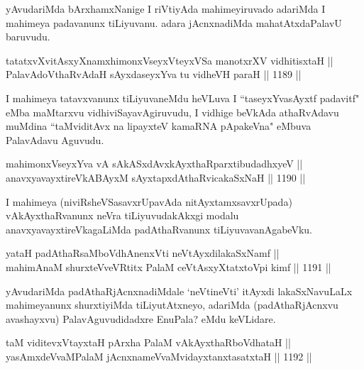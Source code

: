 \begin{artha}
yAvudariMda bArxhamxNanige I riVtiyAda mahimeyiruvado adariMda I mahimeya padavanunx tiLiyuvanu. adara jAcnxnadiMda mahatAtxdaPalavU baruvudu.
\end{artha}


\begin{shl}
tatatxvXvitAsxyXnamxhimonxV\s seyxVteyxVSa manotxrXV vidhitisxtaH || \\
PalavAdoV\s thaRvAdaH sAyxdaseyxYva tu vidheVH paraH \hfill || 1189 ||  
\end{shl}

\begin{artha}
I mahimeya tatavxvanunx tiLiyuvaneMdu heVLuva I ``taseyxYvasAyxtf padavitf" eMba maMtarxvu vidhiviSayavAgiruvudu, I vidhige beVkAda athaRvAdavu muMdina ``taMviditAvx na lipayxteV kamaRNA pApakeVna" eMbuva PalavAdavu Aguvudu.
\end{artha}

\begin{shl}
mahimonxV\s seyxYva vA sAkASxdAvxkAyxthaRparxtibudadhxyeV || \\
anavxyavayxtireVkABAyxM sAyxtapxdAthaRvicakaSxNaH \hfill || 1190 ||  
\end{shl}

\begin{artha}
I mahimeya (niviRsheVSasavxrUpavAda nitAyxtamxsavxrUpada) vAkAyxthaRvanunx neVra tiLiyuvudakAkxgi modalu anavxyavayxtireVkagaLiMda padAthaRvanunx tiLiyuvavanAgabeVku.
\end{artha}


\begin{shl}
yataH padAthaRsaMboVdhAnenxVti neVtAyxdilakaSxNamf || \\
mahimAnaM shurxteVveVRtitx PalaM ceVtAsxyXtatxtoV\s pi kimf \hfill || 1191 ||  
\end{shl}

\begin{artha}
yAvudariMda padAthaRjAcnxnadiMdale `neVtineVti' itAyxdi lakaSxNavuLaLx mahimeyanunx shurxtiyiMda tiLiyutAtxneyo, adariMda (padAthaRjAcnxvu avashayxvu) PalavAguvudidadxre EnuPala? eMdu keVLidare.
\end{artha}

\begin{shl}
taM viditevxVtayxtaH pArxha PalaM vAkAyxthaRboVdhataH || \\
yasAmxdeVvaMPalaM jAcnxnameVvaMvidayxtanxtasatxtaH \hfill || 1192 ||  
\end{shl}
				
